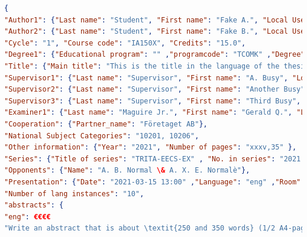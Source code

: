 	
\begin{lstlisting}[language={json}, caption={Resulting fordiva.json file}, label=lst:resultingForDIVAfile]
{
"Author1": {"Last name": "Student", "First name": "Fake A.", "Local User Id": "u100001", "E-mail": "a@kth.se", "organisation": {"L1": "School of Electrical Engineering and Computer Science" }},
"Author2": {"Last name": "Student", "First name": "Fake B.", "Local User Id": "u100002", "E-mail": "b@kth.se", "organisation": {"L1": "School of Architecture and the Built Environment" }},
"Cycle": "1", "Course code": "IA150X", "Credits": "15.0", 
"Degree1": {"Educational program": "" ,"programcode": "TCOMK" ,"Degree": "Bachelors degree" ,"subjectArea": "Information and Communication Technology" }, 
"Title": {"Main title": "This is the title in the language of the thesis", "Subtitle": "An subtitle in the language of the thesis", "Language": "eng" }, "Alternative title": {"Main title": "Detta är den svenska översättningen av titeln", "Subtitle": "Detta är den svenska översättningen av undertiteln", "Language": "swe" }, 
"Supervisor1": {"Last name": "Supervisor", "First name": "A. Busy", "Local User Id": "u100003", "E-mail": "sa@kth.se", "organisation": {"L1": "School of Electrical Engineering and Computer Science" ,"L2": "Computer Science" }}, 
"Supervisor2": {"Last name": "Supervisor", "First name": "Another Busy", "Local User Id": "u100003", "E-mail": "sb@kth.se", "organisation": {"L1": "School of Architecture and the Built Environment" ,"L2": "Architecture" }}, 
"Supervisor3": {"Last name": "Supervisor", "First name": "Third Busy", "E-mail": "sc@tu.va", "Other organisation": "Timbuktu University, Department of Pseudoscience" }, 
"Examiner1": {"Last name": "Maguire Jr.", "First name": "Gerald Q.", "Local User Id": "u1d13i2c", "E-mail": "maguire@kth.se", "organisation": {"L1": "School of Electrical Engineering and Computer Science" ,"L2": "Computer Science" }}, 
"Cooperation": {"Partner_name": "Företaget AB"}, 
"National Subject Categories": "10201, 10206", 
"Other information": {"Year": "2021", "Number of pages": "xxxv,35" }, 
"Series": {"Title of series": "TRITA-EECS-EX" , "No. in series": "2021:00" }, 
"Opponents": {"Name": "A. B. Normal \& A. X. E. Normalè"}, 
"Presentation": {"Date": "2021-03-15 13:00" ,"Language": "eng" ,"Room": "via Zoom https://kth-se.zoom.us/j/ddddddddddd" ,"Address": "Isafjordsgatan 22 (Kistagången 16)" ,"City": "Stockholm" }, 
"Number of lang instances": "10",
"abstracts": {
"eng": €€€€
"Write an abstract that is about \textit{250 and 350 words} (1/2 A4-page)  with the following components: % key parts of the abstract

\end{lstlisting}
